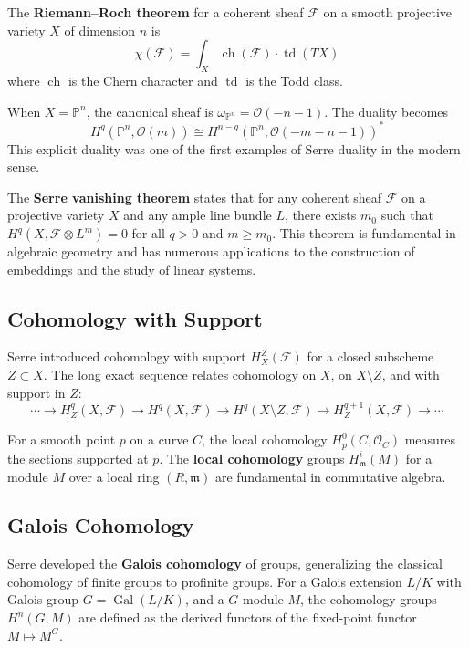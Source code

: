The \textbf{Riemann--Roch theorem} for a coherent sheaf $\mathcal{F}$ on a smooth projective variety $X$ of dimension $n$ is
\[\chi(\mathcal{F}) = \int_X \operatorname{ch}(\mathcal{F}) \cdot \operatorname{td}(TX)\]
where $\operatorname{ch}$ is the Chern character and $\operatorname{td}$ is the Todd class.

When $X = \mathbb{P}^n$, the canonical sheaf is $\omega_{\mathbb{P}^n} = \mathcal{O}(-n-1)$. The duality becomes
\[H^q(\mathbb{P}^n, \mathcal{O}(m)) \cong H^{n-q}(\mathbb{P}^n, \mathcal{O}(-m-n-1))^*\]
This explicit duality was one of the first examples of Serre duality in the modern sense.

The \textbf{Serre vanishing theorem} states that for any coherent sheaf $\mathcal{F}$ on a projective variety $X$ and any ample line bundle $L$, there exists $m_0$ such that $H^q(X, \mathcal{F} \otimes L^m) = 0$ for all $q > 0$ and $m \geq m_0$. This theorem is fundamental in algebraic geometry and has numerous applications to the construction of embeddings and the study of linear systems.

\subsection{Cohomology with Support}

Serre introduced cohomology with support $H^Z_X(\mathcal{F})$ for a closed subscheme $Z \subset X$. The long exact sequence relates cohomology on $X$, on $X \setminus Z$, and with support in $Z$:
\[\cdots \to H^q_Z(X, \mathcal{F}) \to H^q(X, \mathcal{F}) \to H^q(X \setminus Z, \mathcal{F}) \to H^{q+1}_Z(X, \mathcal{F}) \to \cdots\]

For a smooth point $p$ on a curve $C$, the local cohomology $H^0_p(C, \mathcal{O}_C)$ measures the sections supported at $p$. The \textbf{local cohomology} groups $H^i_{\mathfrak{m}}(M)$ for a module $M$ over a local ring $(R, \mathfrak{m})$ are fundamental in commutative algebra.

\subsection{Galois Cohomology}

Serre developed the \textbf{Galois cohomology} of groups, generalizing the classical cohomology of finite groups to profinite groups. For a Galois extension $L/K$ with Galois group $G = \operatorname{Gal}(L/K)$, and a $G$-module $M$, the cohomology groups $H^n(G, M)$ are defined as the derived functors of the fixed-point functor $M \mapsto M^G$.

